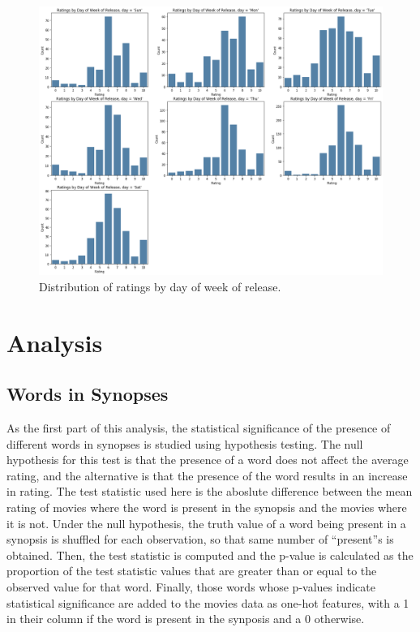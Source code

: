 \documentclass[12pt, oneside]{article}   	%
\begin{document}
\begin{itemize}
\begin{figure}%
\includegraphics[width=\textwidth]{ratings_dow}
\caption{\label{fig:ratings_dow}Distribution of ratings by day of week of release.}
\end{figure}

\end{itemize}

\section{Analysis}

\subsection{Words in Synopses}

As the first part of this analysis, the statistical significance of the presence of different words in synopses is studied using hypothesis testing. The null hypothesis for this test is that the presence of a word does not affect the average rating, and the alternative is that the presence of the word results in an increase in rating. The test statistic used here is the aboslute difference between the mean rating of movies where the word is present in the synopsis and the movies where it is not. Under the null hypothesis, the truth value of a word being present in a synopsis is shuffled for each observation, so that same number of ``present''s is obtained. Then, the test statistic is computed and the p-value is calculated as the proportion of the test statistic values that are greater than or equal to the observed value for that word. Finally, those words whose p-values indicate statistical significance are added to the movies data as one-hot features, with a 1 in their column if the word is present in the synposis and a 0 otherwise.
\end{document}
